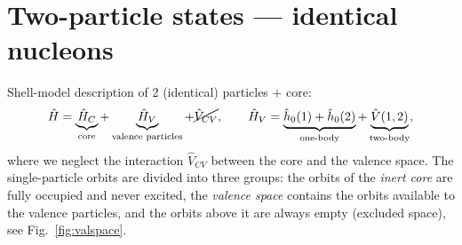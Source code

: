 \documentclass[11pt,a4paper]{article}
\newcommand{\op}[1]{\hat{#1}}
\begin{document}
\section{Two-particle states --- identical nucleons}
Shell-model description of 2 (identical) particles $+$ core:
\[
\op H=\underbrace{\op H_C}_{\text{core}}+\underbrace{\op H_V}_{\text{valence particles}}+\cancel{\op V_{CV}},
\qquad
\op H_V=\underbrace{\op h_0(1)+\op h_0(2)}_{\text{one-body}}+\underbrace{\op V(1,2)}_{\text{two-body}},
\]
where we neglect the interaction $\op V_{CV}$ between the core and the valence space.
The single-particle orbits are divided into three groups: the orbits of the \emph{inert core} are fully occupied and never excited, the \emph{valence space} contains the orbits available to the valence particles, and the orbits above it are always empty (excluded space), see Fig.~\ref{fig:valspace}.
\end{document}
